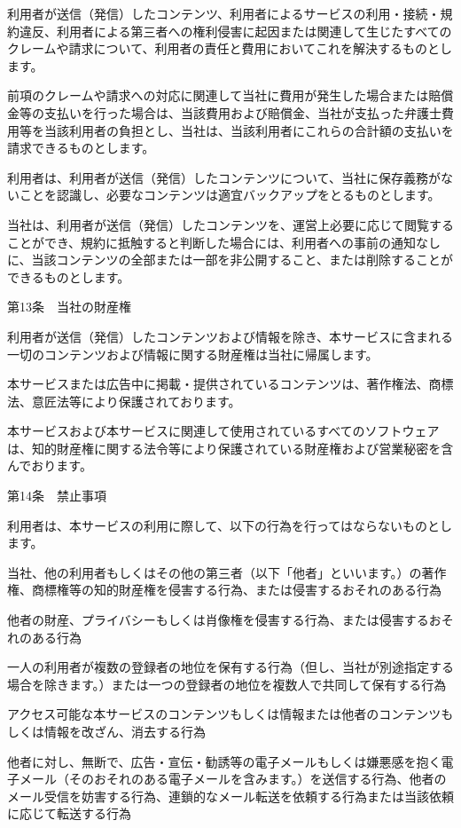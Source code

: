     利用者が送信（発信）したコンテンツ、利用者によるサービスの利用・接続・規約違反、利用者による第三者への権利侵害に起因または関連して生じたすべてのクレームや請求について、利用者の責任と費用においてこれを解決するものとします。

    前項のクレームや請求への対応に関連して当社に費用が発生した場合または賠償金等の支払いを行った場合は、当該費用および賠償金、当社が支払った弁護士費用等を当該利用者の負担とし、当社は、当該利用者にこれらの合計額の支払いを請求できるものとします。

    利用者は、利用者が送信（発信）したコンテンツについて、当社に保存義務がないことを認識し、必要なコンテンツは適宜バックアップをとるものとします。

    当社は、利用者が送信（発信）したコンテンツを、運営上必要に応じて閲覧することができ、規約に抵触すると判断した場合には、利用者への事前の通知なしに、当該コンテンツの全部または一部を非公開すること、または削除することができるものとします。

第13条　当社の財産権

    利用者が送信（発信）したコンテンツおよび情報を除き、本サービスに含まれる一切のコンテンツおよび情報に関する財産権は当社に帰属します。

    本サービスまたは広告中に掲載・提供されているコンテンツは、著作権法、商標法、意匠法等により保護されております。

    本サービスおよび本サービスに関連して使用されているすべてのソフトウェアは、知的財産権に関する法令等により保護されている財産権および営業秘密を含んでおります。

第14条　禁止事項

    利用者は、本サービスの利用に際して、以下の行為を行ってはならないものとします。

        当社、他の利用者もしくはその他の第三者（以下「他者」といいます。）の著作権、商標権等の知的財産権を侵害する行為、または侵害するおそれのある行為

        他者の財産、プライバシーもしくは肖像権を侵害する行為、または侵害するおそれのある行為

        一人の利用者が複数の登録者の地位を保有する行為（但し、当社が別途指定する場合を除きます。）または一つの登録者の地位を複数人で共同して保有する行為

        アクセス可能な本サービスのコンテンツもしくは情報または他者のコンテンツもしくは情報を改ざん、消去する行為

        他者に対し、無断で、広告・宣伝・勧誘等の電子メールもしくは嫌悪感を抱く電子メール（そのおそれのある電子メールを含みます。）を送信する行為、他者のメール受信を妨害する行為、連鎖的なメール転送を依頼する行為または当該依頼に応じて転送する行為

